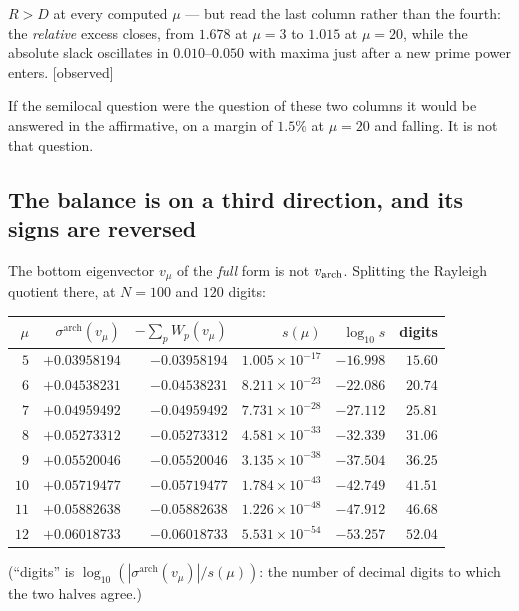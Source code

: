 \documentclass[11pt,a4paper]{article}
\theoremstyle{plain}
\theoremstyle{definition}
\theoremstyle{remark}
\newcommand{\st}[1]{{\normalfont\sffamily\footnotesize[#1]}}
\newcommand{\observed}{\st{observed}}
\begin{document}
\noindent$R>D$ at every computed $\mu$ --- but read the last column rather than
the fourth: the \emph{relative} excess closes, from $1.678$ at $\mu=3$ to
$1.015$ at $\mu=20$, while the absolute slack oscillates in $0.010$--$0.050$
with maxima just after a new prime power enters. \observed

If the semilocal question were the question of these two columns it would be
answered in the affirmative, on a margin of $1.5\%$ at $\mu=20$ and falling.  It
is not that question.

\subsection{The balance is on a third direction, and its signs are reversed}
\label{sec:thirddirection}

The bottom eigenvector $v_\mu$ of the \emph{full} form is not $v_{\rm arch}$.
Splitting the Rayleigh quotient there, at $N=100$ and $120$ digits:

\begin{center}\small
\begin{tabular}{@{}rrrrrr@{}}
\hline
$\mu$ & $\sigma^{\mathrm{arch}}(v_\mu)$ & $-\sum_pW_p(v_\mu)$ & $s(\mu)$ &
$\log_{10}s$ & digits \\
\hline
$5$ & $+0.03958194$ & $-0.03958194$ & $1.005\times10^{-17}$ & $-16.998$ & $15.60$ \\
$6$ & $+0.04538231$ & $-0.04538231$ & $8.211\times10^{-23}$ & $-22.086$ & $20.74$ \\
$7$ & $+0.04959492$ & $-0.04959492$ & $7.731\times10^{-28}$ & $-27.112$ & $25.81$ \\
$8$ & $+0.05273312$ & $-0.05273312$ & $4.581\times10^{-33}$ & $-32.339$ & $31.06$ \\
$9$ & $+0.05520046$ & $-0.05520046$ & $3.135\times10^{-38}$ & $-37.504$ & $36.25$ \\
$10$ & $+0.05719477$ & $-0.05719477$ & $1.784\times10^{-43}$ & $-42.749$ & $41.51$ \\
$11$ & $+0.05882638$ & $-0.05882638$ & $1.226\times10^{-48}$ & $-47.912$ & $46.68$ \\
$12$ & $+0.06018733$ & $-0.06018733$ & $5.531\times10^{-54}$ & $-53.257$ & $52.04$ \\
\hline
\end{tabular}
\end{center}

\noindent(``digits'' is
$\log_{10}(|\sigma^{\mathrm{arch}}(v_\mu)|/s(\mu))$: the number of decimal
digits to which the two halves agree.)
\end{document}
